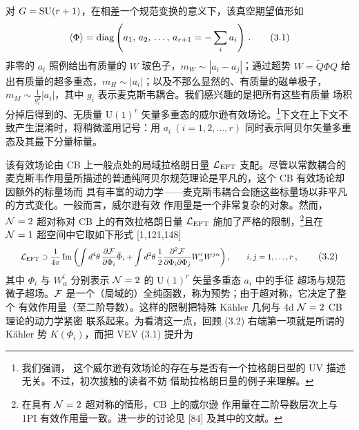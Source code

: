 对 $G=\mathrm{SU}(r+1)$，在相差一个规范变换的意义下，该真空期望值形如
\begin{equation}
  \langle\Phi\rangle = \operatorname{diag}\left(a_1,\,a_2,\,\ldots,\,a_{r+1}=-\sum_i a_i\right)\,.
  \tag{3.1}
\end{equation}
非零的 $a_i$ 照例给出有质量的 $W$ 玻色子，$m_W\sim|a_i-a_j|$；通过超势 $W=\tilde Q\Phi Q$
给出有质量的超多重态，$m_H\sim|a_i|$；以及不那么显然的、有质量的磁单极子，
$m_M\sim\frac{1}{g_i^2}|a_i|$，其中 $g_i$ 表示麦克斯韦耦合。我们感兴趣的是把所有这些有质量
场积分掉后得到的、无质量 $\mathrm{U}(1)^r$ 矢量多重态的威尔逊有效场论。\footnote{我们强调，
这个威尔逊有效场论的存在与是否有一个拉格朗日型的 UV 描述无关。不过，初次接触的读者不妨
借助拉格朗日量的例子来理解。}下文在上下文不致产生混淆时，将稍微滥用记号：用
$a_i\ (i=1,2,\ldots,r)$ 同时表示阿贝尔矢量多重态及其最下分量标量。


该有效场论由 CB 上一般点处的局域拉格朗日量 $\mathcal{L}_{\mathrm{EFT}}$ 支配。尽管以常数耦合的
麦克斯韦作用量所描述的普通纯阿贝尔规范理论是平凡的，这个 CB 有效场论却因额外的标量场而
具有丰富的动力学——麦克斯韦耦合会随这些标量场以非平凡的方式变化。一般而言，威尔逊有效
作用量是一个非常复杂的对象。然而，$\mathcal{N}=2$ 超对称对 CB 上的有效拉格朗日量
$\mathcal{L}_{\mathrm{EFT}}$ 施加了严格的限制，\footnote{在具有 $\mathcal{N}=2$ 超对称的情形，CB 上的威尔逊
作用量在二阶导数层次上与 1PI 有效作用量一致。进一步的讨论见 [84] 及其中的文献。}且在
$\mathcal{N}=1$ 超空间中它取如下形式 [1,121,148]
\begin{equation}
  \resizebox{0.82\textwidth}{!}{$\displaystyle
  \cL_{\mathrm{EFT}} \supset \frac{1}{4\pi}\Im\left(
  \int d^4\theta\,\frac{\partial\cF}{\partial\Phi_i}\bar\Phi_i
  + \int d^2\theta\,\frac{1}{2}\frac{\partial^2\cF}{\partial\Phi_i\partial\Phi_j}
  W^i_\alpha W^{j\alpha}\right),\qquad i,j=1,\ldots,r$}\,,
  \tag{3.2}
\end{equation}
其中 $\Phi_i$ 与 $W^i_\alpha$ 分别表示 $\mathcal{N}=2$ 的 $\mathrm{U}(1)^r$ 矢量多重态 $a_i$ 中的手征
超场与规范微子超场。$\mathcal{F}$ 是一个（局域的）全纯函数，称为预势；由于超对称，它决定了整个
有效作用量（至二阶导数）。这样的限制把特殊 Kähler 几何与 4d $\mathcal{N}=2$ CB 理论的动力学紧密
联系起来。为看清这一点，回顾 (3.2) 右端第一项就是所谓的 Kähler 势
$K(\Phi_i)$，而把 VEV (3.1) 提升为

